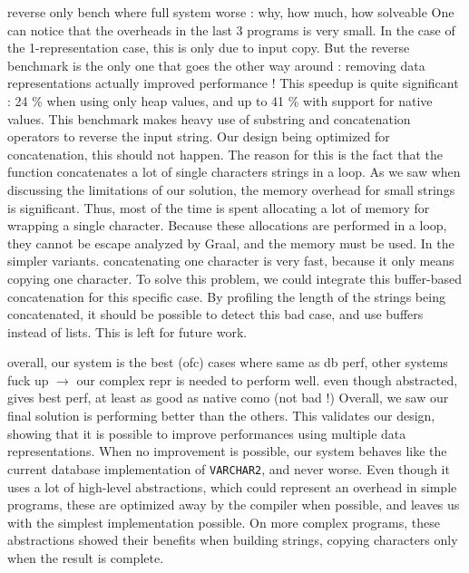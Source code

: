 \documentclass[twoside,11pt,a4paper]{article}
\newcommand{\pls}[1]{\small\texttt{#1}\normalsize}
\newcommand{\plstype}[1]{\pls{#1}}
\newcommand{\varchar}{\plstype{VARCHAR2}}
\newcommand{\bench}[1]{\textsf{#1}}
\begin{document}
reverse only bench where full system worse : why, how much, how solveable
One can notice that the overheads in the last 3 programs is very small. In the case of the 1-representation case, this is only due to input copy. But the \bench{reverse} benchmark is the only one that goes the other way around : removing data representations actually improved performance ! This speedup is quite significant : 24 \% when using only heap values, and up to 41 \% with support for native values. This benchmark makes heavy use of substring and concatenation operators to reverse the input string. Our design being optimized for concatenation, this should not happen. The reason for this is the fact that the function concatenates a lot of single characters strings in a loop. As we saw when discussing the limitations of our solution, the memory overhead for small strings is significant. Thus, most of the time is spent allocating a lot of memory for wrapping a single character. Because these allocations are performed in a loop, they cannot be escape analyzed by Graal, and the memory must be used. In the simpler variants. concatenating one character is very fast, because it only means copying one character. To solve this problem, we could integrate this buffer-based concatenation for this specific case. By profiling the length of the strings being concatenated, it should be possible to detect this bad case, and use buffers instead of lists. This is left for future work.

overall, our system is the best (ofc) cases where same as db perf, other systems fuck up $\rightarrow$ our complex repr is needed to perform well. even though abstracted, gives best perf, at least as good as native como (not bad !)
Overall, we saw our final solution is performing better than the others. This validates our design, showing that it is possible to improve performances using multiple data representations. When no improvement is possible, our system behaves like the current database implementation of \varchar{}, and never worse. Even though it uses a lot of high-level abstractions, which could represent an overhead in simple programs, these are optimized away by the compiler when possible, and leaves us with the simplest implementation possible. On more complex programs, these abstractions showed their benefits when building strings, copying characters only when the result is complete.
\end{document}
